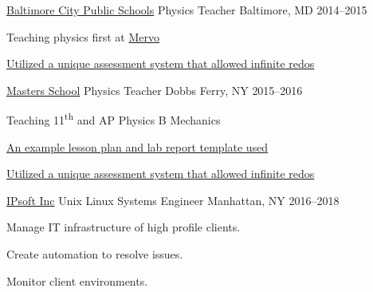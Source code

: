 \begin{cventries}
\cventry
    {\href{http://www.baltimorecityschools.org/}{Baltimore City Public Schools}}
    {Physics Teacher}
    {Baltimore, MD} {2014--2015}
    {
    \begin{cvitems}
      \item {Teaching physics first at \href{http://mervo.org}{Mervo}}
      \item {\href{https://github.com/jphafner/physicsAMC}{Utilized a unique assessment system that allowed infinite redos}}
    \end{cvitems}
    }

\cventry
    {\href{mastersny.org}{Masters School}}
    {Physics Teacher}
    {Dobbs Ferry, NY} {2015--2016}
    {
    \begin{cvitems}
      \item {Teaching 11\textsuperscript{th} and AP Physics B Mechanics}
      \item {\href{https://github.com/jphafner/physicsReport}{An example lesson plan and lab report template used}}
      \item {\href{https://github.com/jphafner/physicsAMC}{Utilized a unique assessment system that allowed infinite redos}}
    \end{cvitems}
    }

\cventry
    {\href{www.ipsoft.com}{IPsoft Inc}}
    {Unix Linux Systems Engineer}
    {Manhattan, NY}
    {2016--2018}
    {
    \begin{cvitems}
        \item Manage IT infrastructure of high profile clients.
        \item Create automation to resolve issues.
        \item Monitor client environments.
    \end{cvitems}
    }

\end{cventries}


